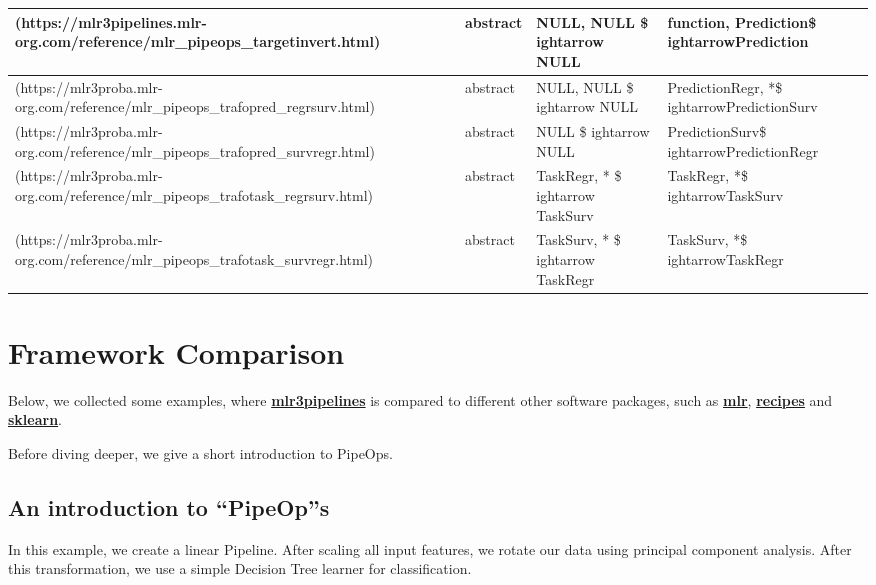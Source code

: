 \documentclass[
]{scrbook}
\begin{document}
\begin{tabular}{l|l|l|l|l}
\hline
[`targetinvert`](https://mlr3pipelines.mlr-org.com/reference/mlr\_pipeops\_targetinvert.html) &  & abstract & NULL, NULL \$
ightarrow NULL & function, Prediction\$
ightarrowPrediction\\
\hline
[`trafopred\_regrsurv`](https://mlr3proba.mlr-org.com/reference/mlr\_pipeops\_trafopred\_regrsurv.html) &  & abstract & NULL, NULL \$
ightarrow NULL & PredictionRegr, *\$
ightarrowPredictionSurv\\
\hline
[`trafopred\_survregr`](https://mlr3proba.mlr-org.com/reference/mlr\_pipeops\_trafopred\_survregr.html) &  & abstract & NULL \$
ightarrow NULL & PredictionSurv\$
ightarrowPredictionRegr\\
\hline
[`trafotask\_regrsurv`](https://mlr3proba.mlr-org.com/reference/mlr\_pipeops\_trafotask\_regrsurv.html) &  & abstract & TaskRegr, * \$
ightarrow TaskSurv & TaskRegr, *\$
ightarrowTaskSurv\\
\hline
[`trafotask\_survregr`](https://mlr3proba.mlr-org.com/reference/mlr\_pipeops\_trafotask\_survregr.html) &  & abstract & TaskSurv, * \$
ightarrow TaskRegr & TaskSurv, *\$
ightarrowTaskRegr\\
\hline
\end{tabular}

\hypertarget{compare-frameworks}{%
\section{Framework Comparison}\label{compare-frameworks}}

Below, we collected some examples, where \textbf{\href{https://cran.r-project.org/package=mlr3pipelines}{mlr3pipelines}} is compared to different other software packages,
such as \textbf{\href{https://cran.r-project.org/package=mlr}{mlr}}, \textbf{\href{https://cran.r-project.org/package=recipes}{recipes}} and \textbf{\href{https://scikit-learn.org/stable/}{sklearn}}.

Before diving deeper, we give a short introduction to PipeOps.

\hypertarget{an-introduction-to-pipeops}{%
\subsection{An introduction to ``PipeOp''s}\label{an-introduction-to-pipeops}}

In this example, we create a linear Pipeline.
After scaling all input features, we rotate our data using principal component analysis.
After this transformation, we use a simple Decision Tree learner for classification.
\end{document}
